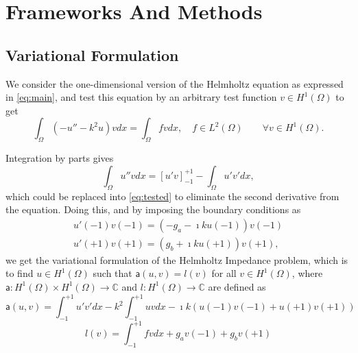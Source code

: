\section{Frameworks And Methods}\label{sec:frameworks}

\subsection{Variational Formulation}
\label{sec:variational}

We consider the one-dimensional version of the Helmholtz equation as expressed in \eqref{eq:main}, and test this equation by an arbitrary test function $v \in H^{1}(\Omega)$ to get
\begin{equation}
    \label{eq:tested}
    \int_{\Omega}{{(-u'' - k^2u)}vdx} = \int_{\Omega}{fvdx}, \quad f \in L^2(\Omega) \qquad \forall v \in {H^{1}(\Omega)}.
\end{equation}

Integration by parts gives
\begin{equation}
    \int_{\Omega}{u''vdx} = [u'v]_{-1}^{+1} - \int_{\Omega}{u'v'dx},
\end{equation}
which could be replaced into \eqref{eq:tested} to eliminate the second derivative from the equation. Doing this, and by imposing the boundary conditions as
\begin{equation}
    \begin{aligned}
        u'(-1)v(-1) = (-g_a-\imath ku(-1))v(-1)\\
        u'(+1)v(+1) = (g_b+\imath ku(+1))v(+1),
    \end{aligned}
\end{equation}
we get the variational formulation of the Helmholtz Impedance problem, which is to find $u \in {H^{1}(\Omega)}$ such that $\mathsf{a}(u,v) = l(v)$ for all $v \in {H^{1}(\Omega)}$, where $\mathsf{a}: H^{1}(\Omega) \times H^{1}(\Omega) \to \mathbb{C}$ and $l: H^{1}(\Omega) \to \mathbb{C}$ are defined as
\begin{equation}
    \label{eq:varlhs}
    \mathsf{a}(u, v) = \int_{-1}^{+1}{u'v'dx} - k^2 \int_{-1}^{+1}{uvdx} - \imath k (u(-1)v(-1) + u(+1)v(+1))
\end{equation}
\begin{equation}
    \label{eq:varrhs}
    l(v) = \int_{-1}^{+1}{fvdx} + g_a v(-1) + g_b v(+1)
\end{equation}


